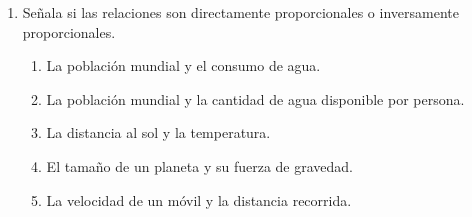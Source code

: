 \documentclass[11pt]{book}
\begin{document}
\begin{enumerate}
  \item Señala si las relaciones son directamente proporcionales o inversamente proporcionales.
        \begin{enumerate}
          \item La población mundial y el consumo de agua.\\
          \item  La población mundial y la cantidad de agua disponible por persona.\\
          \item La distancia al sol y la temperatura.\\
          \item  El tamaño de un planeta y su fuerza de gravedad.\\
          \item  La velocidad de un móvil y la distancia recorrida.\\

\end{enumerate}
\end{enumerate}
\end{document}
